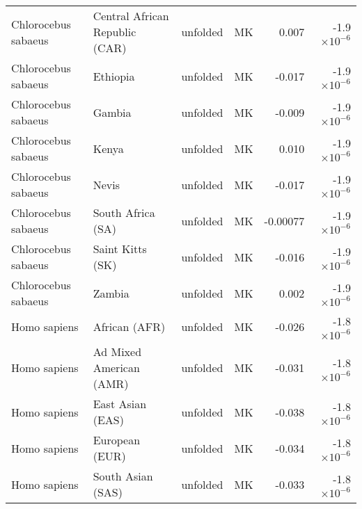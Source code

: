 \begin{tabular}{|l|l|r|r|r|r|}
 Chlorocebus sabaeus &  Central African Republic (CAR) &  unfolded &    MK &    0.007 & -1.9$\times 10^{-6}$ \\
 Chlorocebus sabaeus &                        Ethiopia &  unfolded &    MK &   -0.017 & -1.9$\times 10^{-6}$ \\
 Chlorocebus sabaeus &                          Gambia &  unfolded &    MK &   -0.009 & -1.9$\times 10^{-6}$ \\
 Chlorocebus sabaeus &                           Kenya &  unfolded &    MK &    0.010 & -1.9$\times 10^{-6}$ \\
 Chlorocebus sabaeus &                           Nevis &  unfolded &    MK &   -0.017 & -1.9$\times 10^{-6}$ \\
 Chlorocebus sabaeus &               South Africa (SA) &  unfolded &    MK & -0.00077 & -1.9$\times 10^{-6}$ \\
 Chlorocebus sabaeus &                Saint Kitts (SK) &  unfolded &    MK &   -0.016 & -1.9$\times 10^{-6}$ \\
 Chlorocebus sabaeus &                          Zambia &  unfolded &    MK &    0.002 & -1.9$\times 10^{-6}$ \\
        Homo sapiens &                   African (AFR) &  unfolded &    MK &   -0.026 & -1.8$\times 10^{-6}$ \\
        Homo sapiens &         Ad Mixed American (AMR) &  unfolded &    MK &   -0.031 & -1.8$\times 10^{-6}$ \\
        Homo sapiens &                East Asian (EAS) &  unfolded &    MK &   -0.038 & -1.8$\times 10^{-6}$ \\
        Homo sapiens &                  European (EUR) &  unfolded &    MK &   -0.034 & -1.8$\times 10^{-6}$ \\
        Homo sapiens &               South Asian (SAS) &  unfolded &    MK &   -0.033 & -1.8$\times 10^{-6}$ \\
\bottomrule
\end{tabular}
